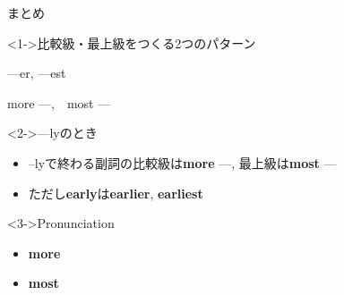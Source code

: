 \documentclass[aspectratio=169,xcolor={dvipsnames,table}]{beamer}
\begin{document}
\begin{frame}[plain]{まとめ}

\begin{block}<1->{比較級・最上級をつくる2つのパターン}
\begin{description}[第2のパターン]\small
 \item[\textcolor{black}{原則:}] ---er, ---est%
	    \hfill{}
 \item[\textcolor{black}{第2のパターン:}]  more ---,\,\,\,\,\,\,most ---
	    \hfill{}\\
	    \mbox{}
 \end{description}
     \end{block}
 
\begin{block}<2->{---lyのとき}
 \begin{itemize}[square]\small
  \item --lyで終わる副詞の比較級は{\bfseries more} ---, 最上級は{\bfseries most} ---
  \item ただし{\bfseries early}は{\bfseries earlier}, {\bfseries earliest}
 \end{itemize}
     \end{block}

\begin{block}<3->{Pronunciation}
 \begin{itemize}[square]\small
  \item {\bfseries more} 
  \item {\bfseries most} 
\end{itemize}
 
\end{block}
\end{frame}
\end{document}

